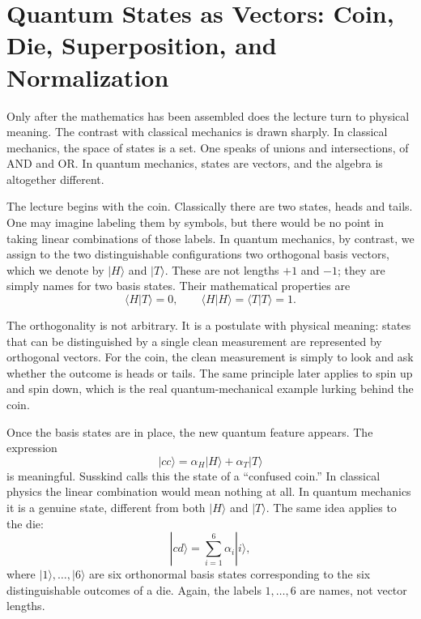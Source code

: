\section{Quantum States as Vectors: Coin, Die, Superposition, and Normalization}

Only after the mathematics has been assembled does the lecture turn to physical meaning. The contrast with classical mechanics is drawn sharply. In classical mechanics, the space of states is a set. One speaks of unions and intersections, of AND and OR. In quantum mechanics, states are vectors, and the algebra is altogether different.

The lecture begins with the coin. Classically there are two states, heads and tails. One may imagine labeling them by symbols, but there would be no point in taking linear combinations of those labels. In quantum mechanics, by contrast, we assign to the two distinguishable configurations two orthogonal basis vectors, which we denote by \(|H\rangle\) and \(|T\rangle\). These are not lengths \(+1\) and \(-1\); they are simply names for two basis states. Their mathematical properties are
\begin{equation}
\langle H|T\rangle = 0,
\qquad
\langle H|H\rangle = \langle T|T\rangle = 1.
\end{equation}

The orthogonality is not arbitrary. It is a postulate with physical meaning: states that can be distinguished by a single clean measurement are represented by orthogonal vectors. For the coin, the clean measurement is simply to look and ask whether the outcome is heads or tails. The same principle later applies to spin up and spin down, which is the real quantum-mechanical example lurking behind the coin.

Once the basis states are in place, the new quantum feature appears. The expression
\begin{equation}
|cc\rangle = \alpha_H |H\rangle + \alpha_T |T\rangle
\end{equation}
is meaningful. Susskind calls this the state of a ``confused coin.'' In classical physics the linear combination would mean nothing at all. In quantum mechanics it is a genuine state, different from both \(|H\rangle\) and \(|T\rangle\). The same idea applies to the die:
\begin{equation}
|cd\rangle = \sum_{i=1}^6 \alpha_i |i\rangle,
\end{equation}
where \(|1\rangle,\dots,|6\rangle\) are six orthonormal basis states corresponding to the six distinguishable outcomes of a die. Again, the labels \(1,\dots,6\) are names, not vector lengths.

